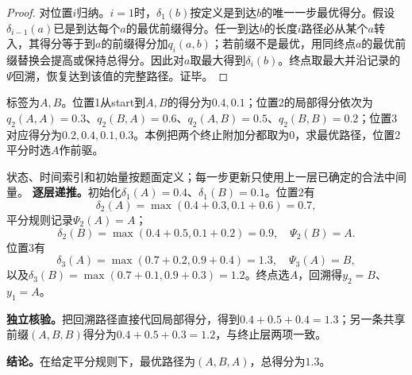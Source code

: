 \begin{proof}
对位置$i$归纳。$i=1$时，$\delta_1(b)$按定义是到达$b$的唯一一步最优得分。假设$\delta_{i-1}(a)$已是到达每个$a$的最优前缀得分。任一到达$b$的长度$i$路径必从某个$a$转入，其得分等于到$a$的前缀得分加$q_i(a,b)$；若前缀不是最优，用同终点$a$的最优前缀替换会提高或保持总得分。因此对$a$取最大得到$\delta_i(b)$。终点取最大并沿记录的$\Psi$回溯，恢复达到该值的完整路径。证毕。
\end{proof}


\label{struct:V3-C06-CH18}
\label{struct:V3-C06-CH32}
\begin{example}[手工执行三步Viterbi]\label{exm:V3-C06-viterbi}
标签为$A,B$。位置1从start到$A,B$的得分为$0.4,0.1$；位置2的局部得分依次为$q_2(A,A)=0.3$、$q_2(B,A)=0.6$、$q_2(A,B)=0.5$、$q_2(B,B)=0.2$；位置3对应得分为$0.2,0.4,0.1,0.3$。本例把两个终止附加分都取为0，求最优路径，位置2平分时选$A$作前驱。

\label{struct:V3-C06-CH33}
\end{example}
\begin{solution}
\SolGiven 状态、时间索引和初始量按题面定义；每一步更新只使用上一层已确定的合法中间量。
\SolDerive
\textbf{逐层递推。}初始化$\delta_1(A)=0.4$、$\delta_1(B)=0.1$。位置2有
\[
\delta_2(A)=\max(0.4+0.3,0.1+0.6)=0.7,
\]
平分规则记录$\Psi_2(A)=A$；
\[
\delta_2(B)=\max(0.4+0.5,0.1+0.2)=0.9,
\quad\Psi_2(B)=A.
\]
位置3有
\[
\delta_3(A)=\max(0.7+0.2,0.9+0.4)=1.3,
\quad\Psi_3(A)=B,
\]
以及$\delta_3(B)=\max(0.7+0.1,0.9+0.3)=1.2$。终点选$A$，回溯得$y_2=B$、$y_1=A$。

\textbf{独立核验。}把回溯路径直接代回局部得分，得到$0.4+0.5+0.4=1.3$；另一条共享前缀$(A,B,B)$得分为$0.4+0.5+0.3=1.2$，与终止层两项一致。

\textbf{结论。}在给定平分规则下，最优路径为$(A,B,A)$，总得分为$1.3$。
\end{solution}

